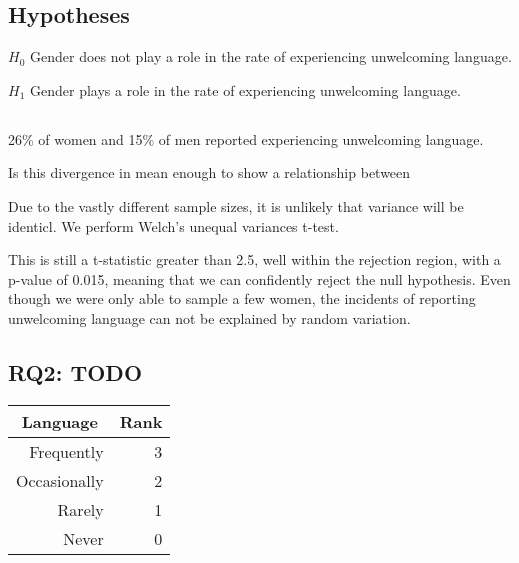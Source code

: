 \documentclass[journal,12pt,onecolumn,]{IEEEtran}
\begin{document}
\subsection{Hypotheses}

$H_0$ Gender does not play a role in the rate of experiencing unwelcoming language.

$H_1$ Gender plays a role in the rate of experiencing unwelcoming language.
\subsection{}

26\% of women and 15\% of men reported experiencing unwelcoming language.

Is this divergence in mean enough to show a relationship between

Due to the vastly different sample sizes, it is unlikely that variance will be identicl.
We perform Welch's unequal variances t-test.

This is still a t-statistic greater than 2.5, well within the rejection region, with a p-value of 0.015, meaning that we can confidently reject the null hypothesis.
Even though we were only able to sample a few women, the incidents of reporting unwelcoming language can not be explained by random variation.

\begin{figure}
    \centering
    
\end{figure}


\subsection{RQ2: TODO}
\begin{table}[]
    \begin{tabular}{|r|r|}
        \hline
        \multicolumn{1}{|c|}{\textbf{Language}} & \multicolumn{1}{c|}{\textbf{Rank}} \\ \hline
        Frequently                              & 3                                  \\ \hline
        Occasionally                            & 2                                  \\ \hline
        Rarely                                  & 1                                  \\ \hline
        Never                                   & 0                                  \\ \hline
    \end{tabular}
\end{table}
\end{document}
